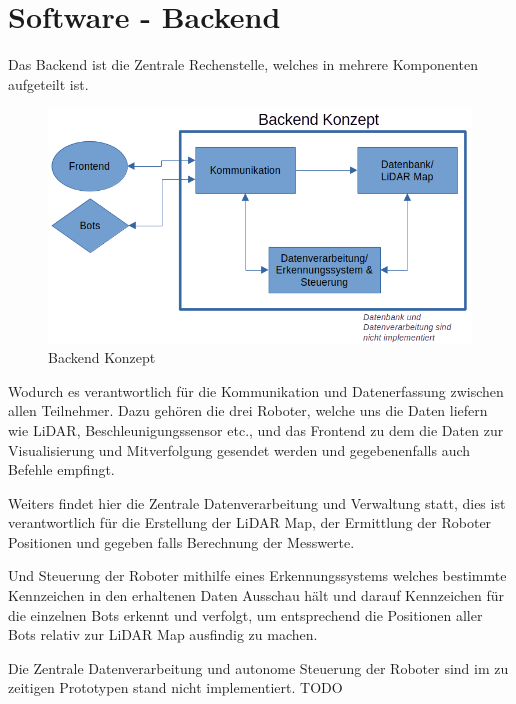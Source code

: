 

\chapter{Software - Backend}
\label{sec:software_backend}
Das Backend ist die Zentrale Rechenstelle, welches in mehrere Komponenten aufgeteilt ist.

\begin{figure}[H]
    \includegraphics[width=\textwidth, center]{img/backend-konzept.png}
    \caption{Backend Konzept}
    \label{fig:backend_konzept}
\end{figure}

Wodurch es verantwortlich für die Kommunikation und Datenerfassung zwischen allen Teilnehmer. 
Dazu gehören die drei Roboter, welche uns die Daten liefern wie LiDAR, Beschleunigungssensor etc., 
und das Frontend zu dem die Daten zur Visualisierung und Mitverfolgung gesendet werden 
und gegebenenfalls auch Befehle empfingt.

Weiters findet hier die Zentrale Datenverarbeitung und Verwaltung statt, 
dies ist verantwortlich für die Erstellung der LiDAR Map, 
der Ermittlung der Roboter Positionen 
und gegeben falls Berechnung der Messwerte. 

Und Steuerung der Roboter mithilfe eines Erkennungssystems 
welches bestimmte Kennzeichen in den erhaltenen Daten Ausschau hält und 
darauf Kennzeichen für die einzelnen Bots erkennt und verfolgt, 
um entsprechend die Positionen aller Bots relativ zur LiDAR Map ausfindig zu machen.

Die Zentrale Datenverarbeitung und autonome Steuerung der Roboter sind 
im zu zeitigen Prototypen stand nicht implementiert.
TODO 

